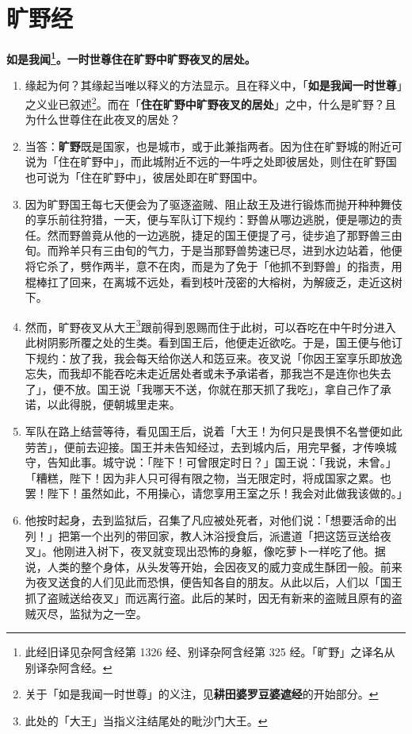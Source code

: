 \section{旷野经}

\textbf{如是我闻\footnote{此经旧译见杂阿含经第 1326 经、别译杂阿含经第 325 经。「旷野」之译名从别译杂阿含经。}。一时世尊住在旷野中旷野夜叉的居处。}

\begin{enumerate}\item 缘起为何？其缘起当唯以释义的方法显示。且在释义中，「\textbf{如是我闻一时世尊}」之义业已叙述\footnote{关于「如是我闻一时世尊」的义注，见\textbf{耕田婆罗豆婆遮经}的开始部分。}。而在「\textbf{住在旷野中旷野夜叉的居处}」之中，什么是旷野？且为什么世尊住在此夜叉的居处？
\item 当答：\textbf{旷野}既是国家，也是城市，或于此兼指两者。因为住在旷野城的附近可说为「住在旷野中」，而此城附近不远的一牛呼之处即彼居处，则住在旷野国也可说为「住在旷野中」，彼居处即在旷野国中。
\item 因为旷野国王每七天便会为了驱逐盗贼、阻止敌王及进行锻炼而抛开种种舞伎的享乐前往狩猎，一天，便与军队订下规约：野兽从哪边逃脱，便是哪边的责任。然而野兽竟从他的一边逃脱，捷足的国王便提了弓，徒步追了那野兽三由旬。而羚羊只有三由旬的气力，于是当那野兽势速已尽，进到水边站着，他便将它杀了，劈作两半，意不在肉，而是为了免于「他抓不到野兽」的指责，用棍棒扛了回来，在离城不远处，看到枝叶茂密的大榕树，为解疲乏，走近这树下。
\item 然而，旷野夜叉从大王\footnote{此处的「大王」当指义注结尾处的毗沙门大王。}跟前得到恩赐而住于此树，可以吞吃在中午时分进入此树阴影所覆之处的生类。看到国王后，他便走近欲吃。于是，国王便与他订下规约：放了我，我会每天给你送人和笾豆来。夜叉说「你因王室享乐即放逸忘失，而我却不能吞吃未走近居处者或未予承诺者，那我岂不是连你也失去了」，便不放。国王说「我哪天不送，你就在那天抓了我吃」，拿自己作了承诺，以此得脱，便朝城里走来。
\item 军队在路上结营等待，看见国王后，说着「大王！为何只是畏惧不名誉便如此劳苦」，便前去迎接。国王并未告知经过，去到城内后，用完早餐，才传唤城守，告知此事。城守说：「陛下！可曾限定时日？」国王说：「我说，未曾。」「糟糕，陛下！因为非人只可得有限之物，当无限定时，将成国家之累。也罢！陛下！虽然如此，不用操心，请您享用王室之乐！我会对此做我该做的。」
\item 他按时起身，去到监狱后，召集了凡应被处死者，对他们说：「想要活命的出列！」把第一个出列的带回家，教人沐浴授食后，派遣道「把这笾豆送给夜叉」。他刚进入树下，夜叉就变现出恐怖的身躯，像吃萝卜一样吃了他。据说，人类的整个身体，从头发等开始，会因夜叉的威力变成生酥团一般。前来为夜叉送食的人们见此而恐惧，便告知各自的朋友。从此以后，人们以「国王抓了盗贼送给夜叉」而远离行盗。此后的某时，因无有新来的盗贼且原有的盗贼灭尽，监狱为之一空。

\end{enumerate}
